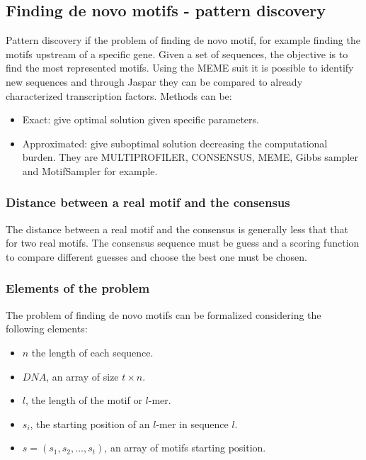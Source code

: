 	\subsection{Finding de novo motifs - pattern discovery}
	Pattern discovery if the problem of finding de novo motif, for example finding the motifs upstream of a specific gene.
	Given a set of sequences, the objective is to find the most represented motifs.
	Using the MEME suit it is possible to identify new sequences and through Jaspar they can be compared to already characterized transcription factors.
	Methods can be:

	\begin{multicols}{2}
		\begin{itemize}
			\item Exact: give optimal solution given specific parameters.
			\item Approximated: give suboptimal solution decreasing the computational burden.
				They are MULTIPROFILER, CONSENSUS, MEME, Gibbs sampler and MotifSampler for example.
		\end{itemize}
	\end{multicols}

		\subsubsection{Distance between a real motif and the consensus}
		The distance between a real motif and the consensus is generally less that that for two real motifs.
		The consensus sequence must be guess and a scoring function to compare different guesses and choose the best one must be chosen.

		\subsubsection{Elements of the problem}
		The problem of finding de novo motifs can be formalized considering the following elements:

		\begin{multicols}{2}
			\begin{itemize}
				\item $n$ the length of each sequence.
				\item $DNA$, an array of size $t\times n$.
				\item $l$, the length of the motif or $l$-mer.
				\item $s_i$, the starting position of an $l$-mer in sequence $l$.
				\item $s = (s_1, s_2, \dots, s_t)$, an array of motifs starting position.
			\end{itemize}
		\end{multicols}

